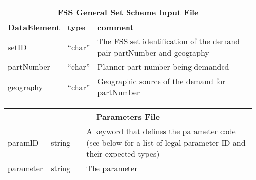 \vspace{.5in}

\begin{tabular}{llp{4in}}
\multicolumn{3}{c}{{\bf FSS General Set Scheme Input File}}\\ 
         \hline\hline
{\bf DataElement} &  {\bf type}  &   {\bf comment} \\ \hline
setID & ``char'' & The FSS set identification of the demand pair partNumber and
 geography\\
partNumber & ``char'' & Planner part number being demanded \\
geography & ``char'' & Geographic source of the demand for partNumber 
\end{tabular} 


\begin{minipage}{7.5in}
\begin{tabular}{lllp{3.5in}}
\multicolumn{4}{c}{{\bf Parameters File}}\\ 
     \hline\hline
paramID    &  string &    &  A keyword that defines the parameter code
                          (see below for a list of legal parameter ID
                          and their expected types) \\
parameter  &  string   &  &  The parameter \\ \hline \hline
 

\end{tabular}
\end{minipage}
